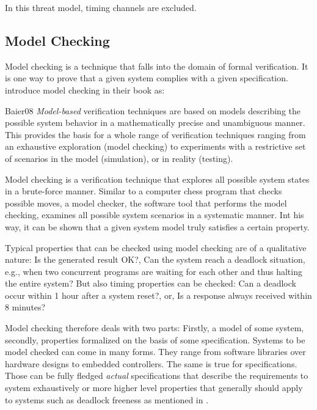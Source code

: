 In this threat model, timing channels are excluded.

\subsection{Model Checking}
\label{sec:model-checking}

Model checking is a technique that falls into the domain of formal verification.
It is one way to prove that a given system complies with a given specification.
\citeauthor{Baier08} introduce model checking in their book  \cite{Baier08} as:
\begin{displaycquote}[p.7ff.]{Baier08}
    \textit{Model-based} verification techniques are based on models describing the possible system behavior in a mathematically precise and unambiguous manner. \textelp{}
    This provides the basis for a whole range of verification techniques ranging from an exhaustive exploration (model checking) to experiments with a restrictive set of scenarios in the model (simulation), or in reality (testing). \textelp{}

    Model checking is a verification technique that explores all possible system states in a brute-force manner.
    Similar to a computer chess program that checks possible moves, a model checker, the software tool that performs the model checking, examines all possible system scenarios in a systematic manner.
    Int his way, it can be shown that a given system model truly satisfies a certain property. \textelp{}

    Typical properties that can be checked using model checking are of a qualitative nature:
    Is the generated result OK?,
    Can the system reach a deadlock situation, e.g., when two concurrent programs are waiting for each other and thus halting the entire system?
    But also timing properties can be checked:
    Can a deadlock occur within 1 hour after a system reset?, or, Is a response always received within 8 minutes?
\end{displaycquote}

Model checking therefore deals with two parts: Firstly, a model of some system, secondly, properties formalized on the basis of some specification.
Systems to be model checked can come in many forms.
They range from software libraries over hardware designs to embedded controllers.
The same is true for specifications.
Those can be fully fledged \textit{actual} specifications that describe the requirements to system exhaustively or more higher level properties that generally should apply to systems such as deadlock freeness as mentioned in \cite{Baier08}.

